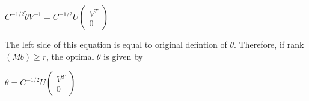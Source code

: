 \begin{center}
    $C^{-1/2}\tilde{\theta}V^{-1} = C^{-1/2}U
    \begin{pmatrix}
    V^{T} \\
    0
    \end{pmatrix}$
\end{center}
The left side of this equation is equal to original defintion of $\theta$. Therefore, if rank$(Mb) \geq r$, the optimal $\theta$ is given by
\begin{center}
    $\theta = C^{-1/2}U
    \begin{pmatrix}
    V^{T} \\
    0
    \end{pmatrix}$
\end{center}